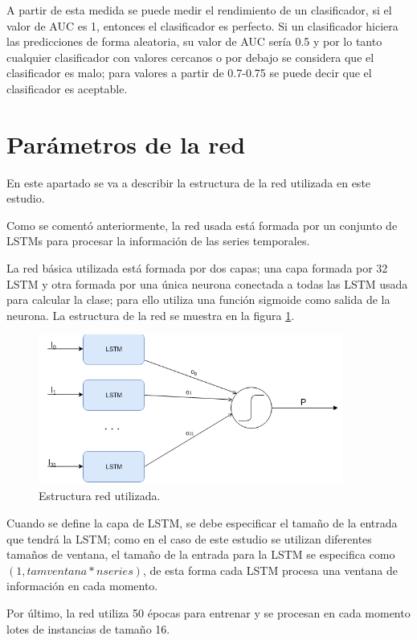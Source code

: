 A partir de esta medida se puede medir el rendimiento de un clasificador, si el valor de AUC es 1, entonces el clasificador es perfecto. Si un clasificador hiciera las predicciones de forma aleatoria, su valor de AUC sería 0.5 y por lo tanto cualquier clasificador con valores cercanos o por debajo se considera que el clasificador es malo; para valores a partir de 0.7-0.75 se puede decir que el clasificador es aceptable.

\section{Parámetros de la red}
En este apartado se va a describir la estructura de la red utilizada en este estudio.\newline

Como se comentó anteriormente, la red usada está formada por un conjunto de LSTMs para procesar la información de las series temporales.\newline

La red básica utilizada está formada por dos capas; una capa formada por 32 LSTM y otra formada por una única neurona conectada a todas las LSTM usada para calcular la clase; para ello utiliza una función sigmoide como salida de la neurona. La estructura de la red se muestra en la figura \ref{fig:63}.\newline

\begin{figure}[H]
	\centering
	\includegraphics[width=100mm]{imagenes/Estructura_Red.png}
	\caption{Estructura red utilizada.}
	\label{fig:63}
\end{figure}
\verticalspace
Cuando se define la capa de LSTM, se debe especificar el tamaño de la entrada que tendrá la LSTM; como en el caso de este estudio se utilizan diferentes tamaños de ventana, el tamaño de la entrada para la LSTM se especifica como $(1, tamventana * nseries )$, de esta forma cada LSTM procesa una ventana de información en cada momento.\newline

Por último, la red utiliza 50 épocas para entrenar y se procesan en cada momento lotes de instancias de tamaño 16.
